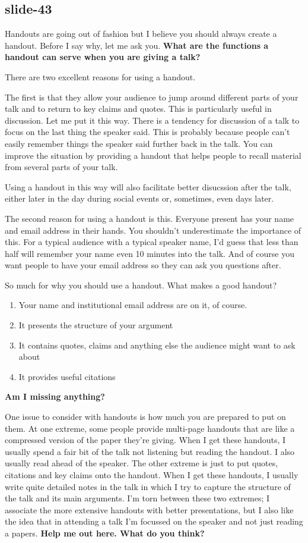 \documentclass[12pt,\papersize]{extarticle}
\begin{document}
\subsection{slide-43}
Handouts are going out of fashion but I believe you should always create a handout.
Before I say why, let me ask you.
\textbf{What are the functions a handout can serve when you are giving a talk?}
 
There are two excellent reasons for using a handout.
 
The first is that they allow your audience to jump around different parts of your talk 
and to return to key claims and quotes.  
This is particularly useful in discussion.
Let me put it this way.
There is a tendency for discussion of a talk to focus on the last thing the speaker said.
This is probably because people can't easily remember things the speaker said further back in the 
talk.
You can improve the situation by providing a handout that helps people to recall material from
several parts of your talk.
 
Using a handout in this way will also facilitate better disucssion after the talk, either 
later in the day during social events or, sometimes, even days later.
 
The second reason for using a handout is this.
Everyone present has your name and email address in their hands.
You shouldn't underestimate the importance of this.  
For a typical audience with a typical speaker name, I'd guess that less than half will remember 
your name even 10 minutes into the talk.
And of course you want people to have your email address so they can ask you questions after.
 
So much for why you should use a handout.
What makes a good handout?
\begin{enumerate}
\item Your name and institutional email address are on it, of course.
\item It presents the structure of your argument
\item It contains quotes, claims and anything else the audience might want to ask about
\item It provides useful citations
\end{enumerate}
\textbf{Am I missing anything?}
 
One issue to consider with handouts is how much you are prepared to put on them.
At one extreme, 
some people provide multi-page handouts that are like a compressed version of the paper they're 
giving.
When I get these handouts, I usually spend a fair bit of the talk not listening but reading the 
handout.   I also usually read ahead of the speaker.
The other extreme is just to put quotes, citations and key claims onto the handout.
When I get these handouts, I usually write quite detailed notes in the talk in which I try to 
capture the structure of the talk and its main arguments.
I'm torn between these two extremes; I associate the more extensive handouts with better 
presentations, but I also like the idea that in attending a talk I'm focussed on the speaker and 
not just reading a papers.
\textbf{Help me out here.  What do you think?}
 
\end{document}
